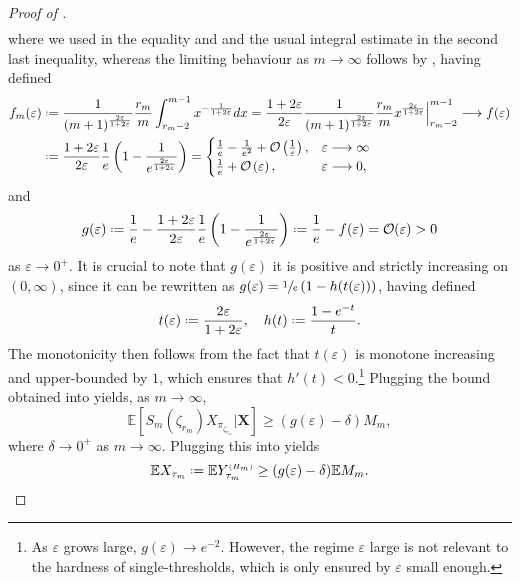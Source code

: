 \documentclass[11pt, a4paper, twoside]{article}
\DeclareRobustCommand{\bigO}{\text{\usefont{OMS}{cmsy}{m}{n}O}}
\newcommand*{\defeq}{\mathrel{\vcenter{\baselineskip0.5ex \lineskiplimit0pt
			\hbox{\scriptsize.}\hbox{\scriptsize.}}}=}
\newcommand{\ssup}[1]{{\scriptscriptstyle{({#1})}}}
\newcommand{\eps}{\varepsilon}
\newcommand{\EE}{\mathbb{E}}
\newcommand{\XX}{\mathbf{X}}
\numberwithin{equation}{section}
\begin{document}
\begin{proof}[Proof of ]
\begin{align*}
		\end{align*}
		where we used  in the equality and  and the usual integral estimate in the second last inequality, whereas the limiting behaviour as $m\longrightarrow\infty$ follows by , having defined
		\begin{align*}
			f_m(\eps)&\defeq\frac{1}{(m+1)^{\frac{2\eps}{1+2\eps}}}\frac{r_m}{m}\int_{r_m-2}^{m-1} x^{-\frac{1}{1+2\eps}}dx=\frac{1+2\eps}{2\eps}\frac{1}{(m+1)^{\frac{2\eps}{1+2\eps}}}\frac{r_m}{m} x^{\frac{2\eps}{1+2\eps}}\Big\vert_{r_m-2}^{m-1}\longrightarrow f(\eps)\\&\defeq \frac{1+2\eps}{2\eps}\frac{1}{e}\left(1-\frac{1}{e^{\frac{2\eps}{1+2\eps}}}\right)=\begin{cases}\frac{1}{e}-\frac{1}{e^2}+\bigO\left(\frac{1}{\eps}\right),&\eps\longrightarrow\infty\\\frac{1}{e}+\bigO\left(\eps\right),&\eps\longrightarrow0,\end{cases}
		\end{align*}
		and \[g(\eps)\defeq\frac{1}{e}-\frac{1+2\eps}{2\eps}\frac{1}{e}\left(1-\frac{1}{e^{\frac{2\eps}{1+2\eps}}}\right)\defeq\frac{1}{e}-f(\eps)=\bigO(\eps)>0\] as $\eps\longrightarrow 0^+$. It is crucial to note that $g(\eps)$ it is positive and strictly increasing on $(0,\infty)$, since it can be rewritten as $g(\eps)=\sfrac{1}{e}\left(1-h(t(\eps))\right)$, having defined \[t(\eps)\defeq\frac{2\eps}{1+2\eps},\quad h(t)\defeq\frac{1-e^{-t}}{t}.\] The monotonicity then follows from the fact that $t(\eps)$ is monotone increasing and upper-bounded by $1$, which ensures that $h'(t)<0$.\footnote{As $\eps$ grows large, $g(\eps)\longrightarrow e^{-2}$. However, the regime $\eps$ large is not relevant to the hardness of single-thresholds, which is only ensured by $\eps$ small enough.} Plugging the bound obtained into  yields, as $m\longrightarrow\infty$,
		\[\EE\left[S_m(\zeta_{r_m})X_{\pi_{\zeta_{r_m}}}|\XX\right]\ge (g(\eps)-\delta)M_m,\]
		where $\delta\longrightarrow 0^+$ as $m\longrightarrow\infty$. Plugging this into  yields
		\[\EE X_{\tau_m}\defeq\EE Y_{\tau_m}^\ssup{H_m}\ge (g(\eps)-\delta)\EE M_m.\]
		

\end{proof}
\end{document}
